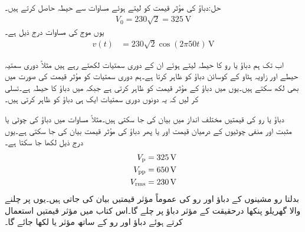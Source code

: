 حل:دباؤ کی مؤثر قیمت کو  لیتے ہوئے  مساوات  سے  حیطہ حاصل کرتے ہیں۔
\begin{align}
V_0=230 \sqrt{2}=\SI{325}{\volt}
\end{align}
یوں موج کی مساوات درج ذیل ہے۔
\begin{align}\label{مساوات_طاقت_پاکستانی_گھریلو_دباو}
v(t)&=230 \sqrt{2}\cos (2\pi 50 t)\, \si{\volt}
\end{align}

اب تک ہم دباؤ یا رو کا حیطہ لیتے ہوئے ان کے دوری سمتیات لکھتے رہے ہیں مثلاً   دوری سمتیہ  حیطے اور  زاویہ ہٹاو کے کوسائن دباؤ کو ظاہر کرتا ہے۔ہم دوری سمتیات کو مؤثر قیمت کی صورت میں بھی لکھ سکتے ہیں۔یوں
  میں  دباؤ کے مؤثر قیمت کو ظاہر کرتی ہے  جبکہ
  میں  دباؤ کا حیطہ ہے۔تسلی کر لیں کہ یہ دونوں دوری سمتیات ایک ہی دباؤ کو ظاہر کرتی ہیں۔

دباؤ یا رو کی قیمتیں مختلف انداز میں بیان کی جا سکتی  ہیں۔مثلاً مساوات  میں دباؤ کی چوٹی  یا مثبت اور منفی چوٹیوں کے درمیان قیمت  اور یا پھر دباؤ کی مؤثر قیمت  بیان کی جا سکتی ہے۔یوں درج ذیل لکھا جا سکتا ہے۔
\begin{align*}
V_{\textup{p}}&=\SI{325}{\volt}\\
V_{\textup{pp}}&=\SI{650}{\volt}\\
{V_{\textup{rms}}}&=\SI{230}{\volt}
\end{align*}
بدلتا رو مشینوں کے دباؤ اور رو کی عموماً مؤثر قیمتیں بیان کی جاتی ہیں۔یوں  پر چلنے والا گھریلو پنکھا درحقیقت  کے مؤثر دباؤ پر چلے گا۔اس کتاب میں مؤثر قیمتیں استعمال کرتے ہوئے دباؤ اور رو کے ساتھ مؤثر یا  لکھا جائے گا۔

